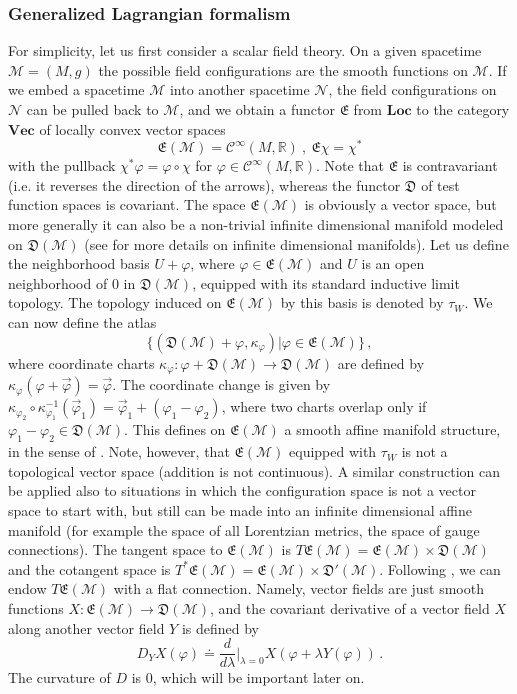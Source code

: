 \documentclass[11pt]{article}
\newcommand{\E}{\mathfrak{E}}
\newcommand{\D}{\mathfrak{D}}
\newcommand{\Ncal}{\mathcal{N}}
\newcommand{\Mcal}{\mathcal{M}}
\newcommand{\Loc}{\mathrm{\mathbf{Loc}}}       %
\newcommand{\Vect}{\mathrm{\mathbf{Vec}}}       %
\newcommand{\RR}{\mathbb{R}}           %
\newcommand{\al}{\alpha}
\newcommand{\la}{\lambda}
\newcommand{\ph}{\varphi}
\newcommand{\1}{\mathds{1}}                         %
\newcommand{\be}{\begin{equation}}
\newcommand{\ee}{\end{equation}}
\begin{document}
{\subsubsection{Generalized Lagrangian formalism}\label{genLagr}
For simplicity, let us first consider a scalar field theory. On a given spacetime $\mathcal{M}=(M,g)$ the possible field configurations are the smooth functions on $\Mcal$. If we embed a spacetime $\Mcal$ into another spacetime $\Ncal$, the field configurations on $\Ncal$ can be pulled back to 
$\Mcal$, and we obtain a functor $\mathfrak{E}$ from $\Loc$ to the category $\Vect$ of locally convex vector
spaces
\be
\mathfrak{E}(\Mcal)=\mathcal{C}^{\infty}(M,\RR)\ ,\ \mathfrak{E}\chi=\chi^*
\ee  
with the pullback $\chi^*\ph=\ph\circ\chi$ for $\ph\in\mathcal{C}^{\infty}(M,\RR)$. Note that $\mathfrak{E}$ is contravariant (i.e. it reverses the direction of the arrows), whereas the functor $\mathfrak{D}$ of test function spaces is covariant. The space $\mathfrak{E}(\Mcal)$ is obviously a vector space, but more generally it can also be a non-trivial infinite dimensional manifold modeled on $\mathfrak{D}(\mathcal{M})$ (see \cite{r11586,Michor,Neeb} for more details on infinite dimensional manifolds). Let us define the neighborhood basis $U+\ph$, where $\ph\in\E(\Mcal)$ and $U$ is an open neighborhood of $0$ in $\D(\Mcal)$, equipped with its standard inductive limit topology. The topology induced on $\E(\Mcal)$ by this basis is denoted by $\tau_W$. We can now define the atlas
\[
\{(\D(\Mcal)+\ph,\kappa_\ph)|\ph\in\E(\Mcal)\}\,,
\]
where coordinate charts $\kappa_\ph:\ph+\D(\Mcal)\rightarrow\D(\Mcal)$ are defined by $\kappa_\ph(\ph+\vec{\ph})=\vec{\ph}$. The coordinate change is given by $\kappa_{\ph_2}\circ\kappa_{\ph_1}^{-1}(\vec{\ph}_1)=\vec{\ph}_1+(\ph_1-\ph_2)$, where two charts overlap only if $\ph_1-\ph_2\in\D(\Mcal)$. This defines on $\E(\Mcal)$ a smooth affine manifold structure, in the sense of \cite{r11586}. Note, however, that $\E(\Mcal)$ equipped with $\tau_W$ is not a topological vector space (addition is not continuous). A similar construction can be applied also to situations in which the configuration space is not a vector space to start with, but still can be made into an infinite dimensional affine manifold (for example the space of all Lorentzian metrics, the space of gauge connections). The tangent space to  $\E(\Mcal)$ is  $T\E(\Mcal)=\E(\Mcal)\times \D(\Mcal)$ and the cotangent space is $T^*\E(\Mcal)=\E(\Mcal)\times \D'(\Mcal)$. Following \cite{BFR}, we can endow $T\E(\Mcal)$ with a flat connection.
Namely, vector fields are just smooth functions $X:\E(\Mcal)\to\D(\Mcal)$, 
and the covariant derivative of a vector field $X$ along another vector field $Y$ is defined by
\[
D_YX(\ph)\doteq\frac{d}{d\la}\Big|_{\la=0}X(\ph+\la Y(\ph))\,.
\]
The curvature of $D$ is 0, which will be important later on.

}
\end{document}
